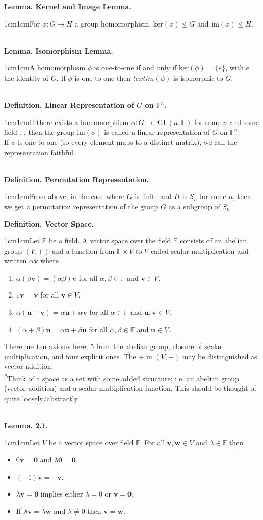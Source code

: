 \documentclass{article}
\newcommand{\vect}[1]{\mathbf{#1}}
\newcommand{\definition}[2]{\textbf{Definition. #1.}\begin{adjustwidth}{1cm}{1cm}#2\end{adjustwidth}}
\newcommand{\lemma}[2]{\textbf{Lemma. #1.}\begin{adjustwidth}{1cm}{1cm}#2\end{adjustwidth}}
\begin{document}
\lemma{Kernel and Image Lemma}{For $\phi : G \rightarrow H$ a group homomorphism, $\text{ker}(\phi) \leq G$ and $\text{im}(\phi) \leq H$.}~\\
\lemma{Isomorphism Lemma}{A homomorphism $\phi$ is one-to-one if and only if $\text{ker}(\phi) = \{e\}$, with $e$ the identity of $G$. If $\phi$ is one-to-one then $text{im}(\phi)$ is isomorphic to $G$.}~\\
\definition{Linear Representation of $G$ on $\mathbb{F}^n$}{If there exists a homomorphism $\phi : G \rightarrow$ GL$(n, \mathbb{F})$ for some $n$ and some field $\mathbb{F}$, then the group im$(\phi)$ is called a linear representation of $G$ on $\mathbb{F}^n$.\\If $\phi$ is one-to-one (so every element maps to a distinct matrix), we call the representation faithful.}~\\
\definition{Permutation Representation}{From above, in the case where $G$ is finite and $H$ is $\mathcal{S}_n$ for some $n$, then we get a permutation representation of the group $G$ as a subgroup of $S_n$.}\newpage
\definition{Vector Space}{Let $\mathbb{F}$ be a field. A vector space over the field $\mathbb{F}$ consists of an abelian group $(V, +)$ and a function from $\mathbb{F} \times V$ to $V$ called scalar multiplication and written $\alpha \vect{v}$ where \begin{enumerate} \item $\alpha(\beta \vect{v}) = (\alpha \beta)\vect{v}$ for all $\alpha, \beta \in \mathbb{F}$ and $\vect{v} \in V$. \item $1\vect{v} = \vect{v}$ for all $\vect{v} \in V$. \item $\alpha (\vect{u} + \vect{v}) = \alpha \vect{u} + \alpha \vect{v}$ for all $\alpha \in \mathbb{F}$ and $\vect{u}, \vect{v} \in V$. \item $(\alpha + \beta) \vect{u} = \alpha \vect{u} + \beta \vect{u}$ for all $\alpha, \beta \in \mathbb{F}$ and $\vect{u} \in V$.\end{enumerate}There are ten axioms here; 5 from the abelian group, closure of scalar multiplication, and four explicit ones. The $+$ in $(V, +)$ may be distinguished as vector addition.\\[1\baselineskip]\textsuperscript{*}Think of a space as a set with some added structure; i.e. an abelian group (vector addition) and a scalar multiplication function. This should be thought of quite loosely/abstractly.}~\\
\lemma{2.1}{Let $V$ be a vector space over field $\mathbb{F}$. For all $\vect{v}, \vect{w} \in V$ and $\lambda \in \mathbb{F}$ then \begin{itemize}
  \item $0\vect{v} = \vect{0}$ and $\lambda \vect{0} = \vect{0}$.
  \item $(-1)\vect{v} = -\vect{v}$.
  \item $\lambda \vect{v} = \vect{0}$ implies either $\lambda = 0$ or $\vect{v} = \vect{0}$.
  \item If $\lambda \vect{v} = \lambda \vect{w}$ and $\lambda \neq 0$ then $\vect{v} = \vect{w}$.
\end{itemize}}~\\
\end{document}
